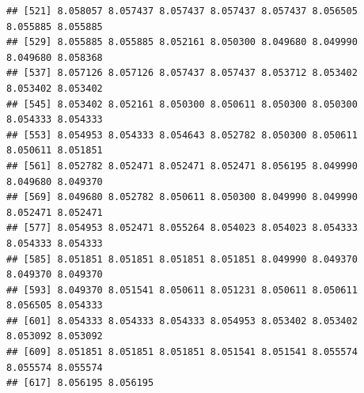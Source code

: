 \documentclass[
]{article}
\newenvironment{Shaded}{\begin{snugshade}}{\end{snugshade}}
\newcommand{\CommentTok}[1]{\textcolor[rgb]{0.56,0.35,0.01}{\textit{#1}}}
\newcommand{\DecValTok}[1]{\textcolor[rgb]{0.00,0.00,0.81}{#1}}
\newcommand{\FloatTok}[1]{\textcolor[rgb]{0.00,0.00,0.81}{#1}}
\newcommand{\FunctionTok}[1]{\textcolor[rgb]{0.00,0.00,0.00}{#1}}
\newcommand{\NormalTok}[1]{#1}
\newcommand{\OtherTok}[1]{\textcolor[rgb]{0.56,0.35,0.01}{#1}}
\newcommand{\SpecialCharTok}[1]{\textcolor[rgb]{0.00,0.00,0.00}{#1}}
\begin{document}
\begin{verbatim}
## [521] 8.058057 8.057437 8.057437 8.057437 8.057437 8.056505 8.055885 8.055885
## [529] 8.055885 8.055885 8.052161 8.050300 8.049680 8.049990 8.049680 8.058368
## [537] 8.057126 8.057126 8.057437 8.057437 8.053712 8.053402 8.053402 8.053402
## [545] 8.053402 8.052161 8.050300 8.050611 8.050300 8.050300 8.054333 8.054333
## [553] 8.054953 8.054333 8.054643 8.052782 8.050300 8.050611 8.050611 8.051851
## [561] 8.052782 8.052471 8.052471 8.052471 8.056195 8.049990 8.049680 8.049370
## [569] 8.049680 8.052782 8.050611 8.050300 8.049990 8.049990 8.052471 8.052471
## [577] 8.054953 8.052471 8.055264 8.054023 8.054023 8.054333 8.054333 8.054333
## [585] 8.051851 8.051851 8.051851 8.051851 8.049990 8.049370 8.049370 8.049370
## [593] 8.049370 8.051541 8.050611 8.051231 8.050611 8.050611 8.056505 8.054333
## [601] 8.054333 8.054333 8.054333 8.054953 8.053402 8.053402 8.053092 8.053092
## [609] 8.051851 8.051851 8.051851 8.051541 8.051541 8.055574 8.055574 8.055574
## [617] 8.056195 8.056195
\end{verbatim}

\begin{Shaded}
\end{Shaded}
\end{document}
